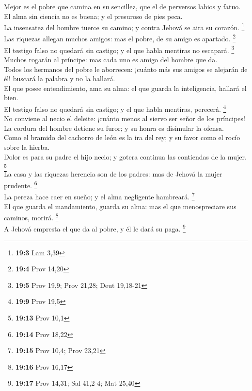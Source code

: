  Mejor es el pobre que camina en su sencillez, que el de
perversos labios y fatuo.\\
 El alma sin ciencia no es buena; y el presuroso de pies
peca.\\
 La insensatez del hombre tuerce su camino; y contra Jehová
se aira su corazón. \footnote{\textbf{19:3} Lam 3,39}\\
 Las riquezas allegan muchos amigos: mas el pobre, de su
amigo es apartado. \footnote{\textbf{19:4} Prov 14,20}\\
 El testigo falso no quedará sin castigo; y el que habla
mentiras no escapará. \footnote{\textbf{19:5} Prov 19,9; Prov 21,28;
  Deut 19,18-21}\\
 Muchos rogarán al príncipe: mas cada uno es amigo del
hombre que da.\\
 Todos los hermanos del pobre le aborrecen: ¡cuánto más sus
amigos se alejarán de él! buscará la palabra y no la hallará.\\
 El que posee entendimiento, ama su alma: el que guarda la
inteligencia, hallará el bien.\\
 El testigo falso no quedará sin castigo; y el que habla
mentiras, perecerá. \footnote{\textbf{19:9} Prov 19,5}\\
 No conviene al necio el deleite: ¡cuánto menos al siervo
ser señor de los príncipes!\\
 La cordura del hombre detiene su furor; y su honra es
disimular la ofensa.\\
 Como el bramido del cachorro de león es la ira del rey; y
su favor como el rocío sobre la hierba.\\
 Dolor es para su padre el hijo necio; y gotera continua
las contiendas de la mujer. \footnote{\textbf{19:13} Prov 10,1}\\
 La casa y las riquezas herencia son de los padres: mas de
Jehová la mujer prudente. \footnote{\textbf{19:14} Prov 18,22}\\
 La pereza hace caer en sueño; y el alma negligente
hambreará. \footnote{\textbf{19:15} Prov 10,4; Prov 23,21}\\
 El que guarda el mandamiento, guarda su alma: mas el que
menospreciare sus caminos, morirá. \footnote{\textbf{19:16} Prov 16,17}\\
 A Jehová empresta el que da al pobre, y él le dará su
paga. \footnote{\textbf{19:17} Prov 14,31; Sal 41,2-4; Mat 25,40}\\
